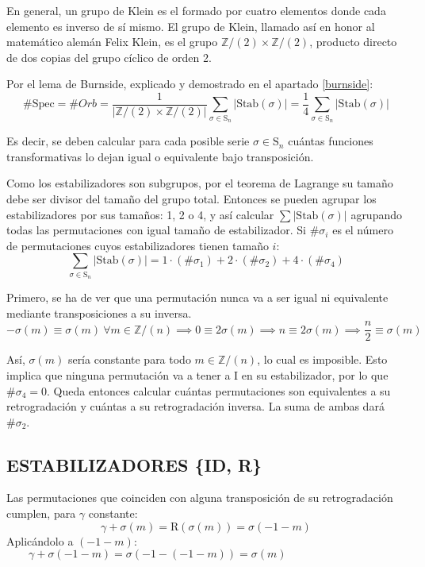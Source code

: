 		En general, un grupo de Klein es el formado por cuatro elementos donde cada elemento es inverso de sí mismo. El grupo de Klein, llamado así en honor al matemático alemán Felix Klein, es el grupo $\mathbb{Z}/(2)\times\mathbb{Z}/(2)$, producto directo de dos copias del grupo cíclico de orden 2.
		
		Por el lema de Burnside, explicado y demostrado en el apartado \ref{burnside}:	
		$$\#\text{Spec}=\#Orb=\frac{1}{|\mathbb{Z}/(2)\times\mathbb{Z}/(2)|}\sum_{\sigma\in\text{S}_n}|\text{Stab}(\sigma)|=\frac{1}{4}\sum_{\sigma\in\text{S}_n}|\text{Stab}(\sigma)|$$
		
		Es decir, se deben calcular para cada posible serie $\sigma\in\text{S}_n$ cuántas funciones transformativas lo dejan igual o equivalente bajo transposición.
		
		Como los estabilizadores son subgrupos, por el teorema de Lagrange su tamaño debe ser divisor del tamaño del grupo total. Entonces se pueden agrupar los estabilizadores por sus tamaños: 1, 2 o 4, y así calcular $\sum|\text{Stab}(\sigma)|$ agrupando todas las permutaciones con igual tamaño de estabilizador. Si $\#\sigma_i$ es el número de permutaciones cuyos estabilizadores tienen tamaño $i$:		
		$$\sum_{\sigma\in\text{S}_n}|\text{Stab}(\sigma)|=1\cdot(\#\sigma_1)+2\cdot(\#\sigma_2)+4\cdot(\#\sigma_4)$$
	
		Primero, se ha de ver que una permutación nunca va a ser igual ni equivalente mediante transposiciones a su inversa.	\label{inversano}	
		$$-\sigma(m)\equiv\sigma(m)\ \forall m\in \mathbb{Z} / (n) \implies 0\equiv2\sigma(m)\implies n\equiv2\sigma(m) \implies \frac{n}{2}\equiv\sigma(m)$$
		
		Así, $\sigma(m)$ sería constante para todo $m\in \mathbb{Z} / (n)$, lo cual es imposible. Esto implica que ninguna permutación va a tener a I en su estabilizador, por lo que $\#\sigma_4=0$. Queda entonces calcular cuántas permutaciones son equivalentes a su retrogradación y cuántas a su retrogradación inversa. La suma de ambas dará $\#\sigma_2$.
	
	\subsection{ESTABILIZADORES \{ID, R\}}
		Las permutaciones que coinciden con alguna transposición de su retrogradación cumplen, para $\gamma$ constante:
		$$\gamma+\sigma(m)=\text{R}(\sigma(m))=\sigma(-1-m)$$
		Aplicándolo a $(-1-m)$: $\qquad\gamma+\sigma(-1-m)=\sigma(-1-(-1-m))=\sigma(m)$
		
